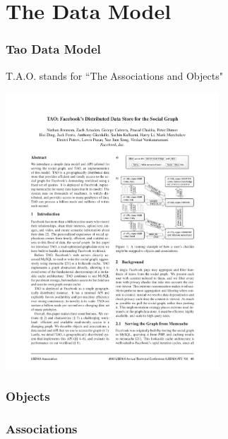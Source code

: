 \section{The Data Model}

\begin{frame}
\frametitle{Tao Data Model}
 	T.A.O. stands for ``The Associations and Objects"
 	\begin{center}
 	\includegraphics[width=0.6\textwidth]{figs/social2}		
 	\end{center}
\end{frame}

\begin{frame}
\frametitle{Objects}
    


\end{frame}


\begin{frame}
\frametitle{Associations}
    


\end{frame}